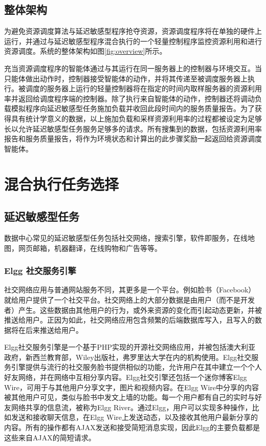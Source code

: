 \subsection{整体架构}
为避免资源调度算法与延迟敏感型程序抢夺资源，资源调度程序将在单独的硬件上运行，并通过与延迟敏感型程序混合执行的一个轻量控制程序监控资源利用和进行资源调度。系统的整体架构如图\ref{fig:overview}所示。

充当资源调度程序的智能体通过与其运行在同一服务器上的控制器与环境交互。当只能体做出动作时，控制器接受智能体的动作，并将其传递至被调度服务器上执行。被调度的服务器上运行的轻量控制器将在指定的时间内取样服务器的资源利用率并返回给调度程序端的控制器。除了执行来自智能体的动作，控制器还将调动负载模拟程序向延迟敏感型任务施加负载并收回此段时间内的服务质量报告。为了获得具有统计学意义的数据，以上施加负载和采样资源利用率的过程都被设定为足够长以允许延迟敏感型任务服务足够多的请求。所有搜集到的数据，包括资源利用率报告和服务质量报告，将作为环境状态和计算出的此步骤奖励一起返回给资源调度智能体。

\section{混合执行任务选择}
\subsection{延迟敏感型任务}
数据中心常见的延迟敏感型任务包括社交网络，搜索引擎，软件即服务，在线地图，网页邮箱，机器翻译，在线购物和广告等等。

\subsubsection{Elgg 社交服务引擎}
社交网络应用与普通网站服务不同，其更多是一个平台。例如脸书（Facebook）就给用户提供了一个社交平台。社交网络上的大部分数据是由用户（而不是开发者）产生。这些数据由其他用户的行为，或外来资源的变化而引起动态更新，并被推送给用户。正因为如此，社交网络应用包含频繁的后端数据库写入，且写入的数据将在后来推送给用户。

Elgg社交服务引擎是一个基于PHP实现的开源社交网络应用，并被包括澳大利亚政府，新西兰教育部，Wiley出版社，弗罗里达大学在内的机构使用\cite{palit2016demystifying}。Elgg社交服务引擎提供与流行的社交服务脸书提供相似的功能，允许用户在其中建立一个个人好友网络，并在网络中互相分享内容。Elgg社交引擎还包括一个迷你博客Elgg Wire，可用于与其他用户分享文字，图片和视频内容。在Elgg Wire中分享的内容被其他用户可见，类似与脸书中发文上墙的功能。每一个用户都有自己的实时与好友网络共享的信息流，被称为Elgg River。通过Elgg，用户可以实现多种操作，比如发送和接收聊天信息，在Elgg Wire上发送动态，以及接收其他用户最新分享的内容。所有的操作都有AJAX发送和接受简短消息实现，因此Elgg的主要负载都是这些来自AJAX的简短请求。

